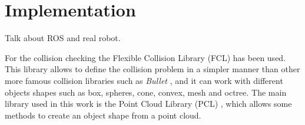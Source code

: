 \chapter{Implementation}
\label{ch:implementation}
Talk about ROS and real robot. 

For the collision checking the Flexible Collision Library (FCL) \citep{pan2012fcl} has been used. This library allows to define the collision problem in a simpler manner than other more famous collision libraries such as \textit{Bullet} \citep{Bullet}, and it can work with different objects shapes such as box, spheres, cone, convex, mesh and octree. 
The main library used in this work is the Point Cloud Library (PCL) \citep{PCL_}, which allows some methods to create an object shape from a point cloud.